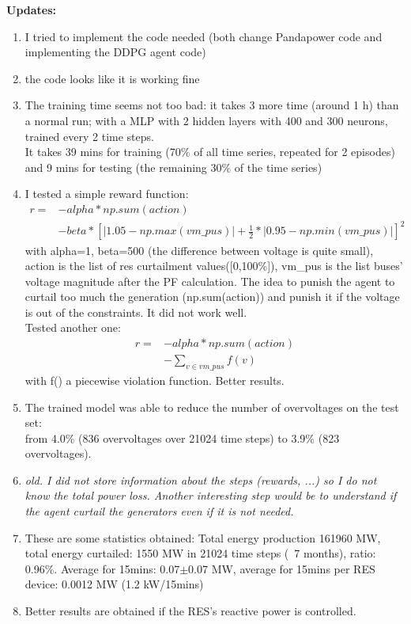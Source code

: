\noindent \textbf{Updates:}
\begin{enumerate}
    \item I tried to implement the code needed (both change Pandapower code and implementing the DDPG agent code)
    \item the code looks like it is working fine
    \item The training time seems not too bad: it takes 3 more time (around 1 h) than a normal run; with a MLP with 2 hidden layers with 400 and 300 neurons, trained every 2 time steps.\\
    It takes 39 mins for training (70\% of all time series, repeated for 2 episodes) and 9 mins for testing (the remaining 30\% of the time series)
    \item I tested a simple reward function:
    \begin{align*}
        r = &- alpha * np.sum(action) \\
            &- beta*[|1.05-np.max(vm\_pus)|+\frac{1}{2}*|0.95-np.min(vm\_pus)|]^2
    \end{align*}
    with alpha=1, beta=500 (the difference between voltage is quite small), action is the list of res curtailment values([0,100\%]), vm\_pus is the list buses' voltage magnitude after the PF calculation. The idea to punish the agent to curtail too much the generation (np.sum(action)) and punish it if the voltage is out of the constraints. It did not work well. \\
    
    Tested another one:
    \begin{align*}
        r = &- alpha * np.sum(action) \\
            &- \sum_{v \in vm\_pus} f(v)
    \end{align*}
    with f() a piecewise violation function. Better results.
    \item The trained model was able to reduce the number of overvoltages on the test set:\\
    from 4.0\% (836 overvoltages over 21024 time steps) to 3.9\% (823 overvoltages). 
    \item \emph{old. I did not store information about the steps (rewards, ...) so I do not know the total power loss. Another interesting step would be to understand if the agent curtail the generators even if it is not needed.}
    \item These are some statistics obtained:
    Total energy production 161960 MW, total energy curtailed: 1550 MW in 21024 time steps (~7 months), ratio: 0.96\%. Average for 15mins: 0.07$\pm$0.07 MW, average for 15mins per RES device: 0.0012 MW (1.2 kW/15mins)
    \item Better results are obtained if the RES's reactive power is controlled.
\end{enumerate}

